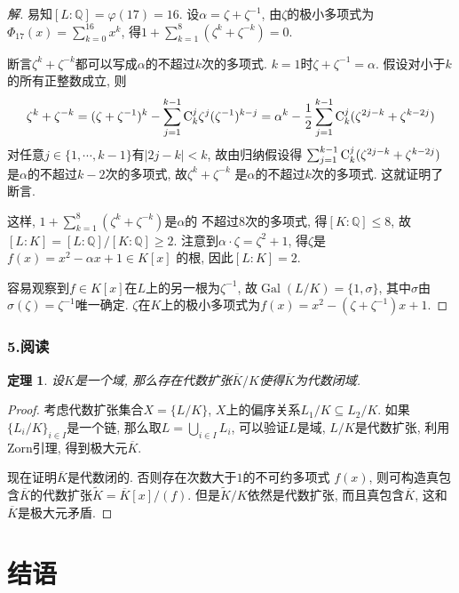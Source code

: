 \documentclass[12pt, a4paper, fontset=windows]{ctexart}
\newcommand{\Q}{\mathbb{Q}}
\newcommand{\Gal}{\operatorname{Gal}}
\newcommand{\abs}[1]{\left|{#1}\right|}
\newcommand{\cl}[1]{\overline{#1}} %
\newcommand{\yuedu}{{\normalsize 阅读}}
\newtheorem*{theorem}{定理}
\newenvironment{solution}{\begin{proof}[解]}{\end{proof}}
\begin{document}
\begin{solution}
易知$[L:\Q]=\varphi(17)=16$. 设$\alpha=\zeta+\zeta^{-1}$, 
由$\zeta$的极小多项式为$\Phi_{17}(x)=\sum^{16}_{k=0}x^k$, 
得$1+\sum^{8}_{k=1}(\zeta^k+\zeta^{-k})=0$. 

断言$\zeta^k+\zeta^{-k}$都可以写成$\alpha$的不超过$k$次的多项式. 
$k=1$时$\zeta+\zeta^{-1}=\alpha$. 假设对小于$k$的所有正整数成立, 则
\[\zeta^k+\zeta^{-k}=(\zeta+\zeta^{-1})^k-\sum^{k-1}_{j=1}{\rm C}^j_k\zeta^j(\zeta^{-1})^{k-j}=\alpha^k-\frac12\sum^{k-1}_{j=1}{\rm C}^j_k(\zeta^{2j-k}+\zeta^{k-2j})\]
对任意$j\in\{1,\cdots,k-1\}$有$\abs{2j-k}<k$, 故由归纳假设得
$\sum^{k-1}_{j=1}{\rm C}^j_k(\zeta^{2j-k}+\zeta^{k-2j})$
是$\alpha$的不超过$k-2$次的多项式, 故$\zeta^k+\zeta^{-k}$
是$\alpha$的不超过$k$次的多项式. 这就证明了断言. 

这样, $1+\sum^8_{k=1}(\zeta^k+\zeta^{-k})$是$\alpha$的
不超过$8$次的多项式, 得$[K:\Q]\le 8$, 故$[L:K]=[L:\Q]/[K:\Q]\ge 2$. 
注意到$\alpha\cdot\zeta=\zeta^2+1$, 得$\zeta$是$f(x)=x^2-\alpha x+1\in K[x]$
的根, 因此$[L:K]=2$. 

容易观察到$f\in K[x]$在$L$上的另一根为$\zeta^{-1}$, 
故$\Gal(L/K)=\{1,\sigma\}$, 其中$\sigma$由$\sigma(\zeta)=\zeta^{-1}$唯一确定. 
$\zeta$在$K$上的极小多项式为$f(x)=x^2-(\zeta+\zeta^{-1})x+1$. 
\end{solution}

\section*{5.\yuedu}

\begin{theorem}
设$K$是一个域, 那么存在代数扩张$\cl{K}/K$使得$\cl{K}$为代数闭域. 
\end{theorem}

\begin{proof}
考虑代数扩张集合$X=\{L/K\}$, $X$上的偏序关系$L_1/K\subseteq L_2/K$. 
如果$\{L_i/K\}_{i\in I}$是一个链, 那么取$L=\bigcup_{i\in I}L_i$, 
可以验证$L$是域, $L/K$是代数扩张, 利用Zorn引理, 得到极大元$\cl{K}$. 

现在证明$\cl{K}$是代数闭的. 否则存在次数大于$1$的不可约多项式
$f(x)$, 则可构造真包含$\cl{K}$的代数扩张$\widetilde{K}=\cl{K}[x]/(f)$. 
但是$\widetilde{K}/K$依然是代数扩张, 而且真包含$\cl{K}$, 这和$\cl{K}$是极大元矛盾. 
\end{proof}

\clearpage
{}
\part*{结语}
\end{document}
